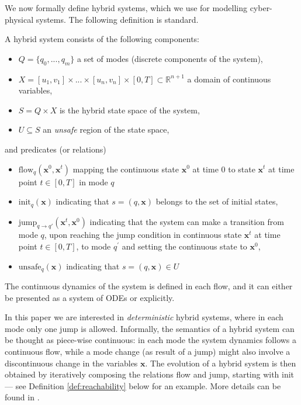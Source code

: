 
We now formally define hybrid systems, which we use for modelling cyber-physical systems. The following
definition is standard.

\begin{definition}
A hybrid system consists of the following components:
\begin{itemize}
\item $Q = \{q_0, ..., q_m\}$ a set of modes (discrete components of the system),
\item $X = [u_1, v_1] \times ... \times [u_n, v_n] \times [0, T] \subset \mathbb{R}^{n+1}$ a domain 
	of continuous variables,
\item $S = Q \times X$ is the hybrid state space of the system,
\item $U \subseteq S$ an {\em unsafe} region of the state space,
\end{itemize}
and predicates (or relations)
\begin{itemize}
	\item $\text{flow}_{q}(\textbf{x}^{0}, \textbf{x}^{t})$ mapping the continuous state 
	$\textbf{x}^{0}$ at time 0 to state $\textbf{x}^{t}$ at time point $t \in [0, T]$ in mode $q$
	\item $\text{init}_q(\textbf{x})$ indicating that $s = (q, \textbf{x})$ belongs to the set 
	of initial states,
	\item $\text{jump}_{q \rightarrow q'}(\textbf{x}^{t}, \textbf{x}^{0})$ indicating that the 
	system can make a transition from mode $q$, upon reaching the jump condition in continuous 
	state $\textbf{x}^{t}$ at time point $t \in [0, T]$, to mode $q^\prime$ and setting the
	continuous state to $\textbf{x}^{0}$,
	\item $\text{unsafe}_{q}(\textbf{x})$ indicating that $s = (q, \textbf{x}) \in U$
\end{itemize}
\end{definition}
\begin{remark}
The continuous dynamics of the system is defined in each flow, and it can either be presented 
as a system of ODEs or explicitly.
\end{remark}

In this paper we are interested in {\em deterministic} hybrid systems, where in each mode only
one jump is allowed. Informally, the semantics of a hybrid system can be thought as piece-wise
continuous: in each mode the system dynamics follows a continuous flow, while a mode change
(as result of a jump) might also involve a discontinuous change in the variables $\textbf{x}$.
The evolution of a hybrid system is then obtained by iteratively composing the relations flow and
jump, starting with init --- see Definition \ref{def:reachability} below for an example. More details 
can be found in \cite{DBLP:conf/hybrid/AlurCHH92}.

